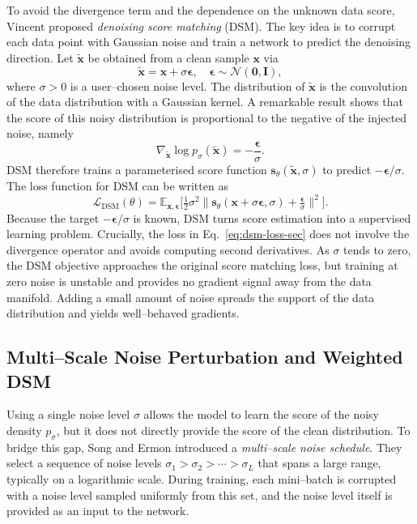To avoid the divergence term and the dependence on the unknown data
score, Vincent proposed \emph{denoising score matching} (DSM).  The key
idea is to corrupt each data point with Gaussian noise and train a
network to predict the denoising direction.  Let $\tilde{\mathbf{x}}$ be
obtained from a clean sample $\mathbf{x}$ via
\begin{equation}
    \tilde{\mathbf{x}} = \mathbf{x} + \sigma \boldsymbol{\epsilon},
    \quad \boldsymbol{\epsilon} \sim \mathcal{N}(\mathbf{0},\mathbf{I}),
    \label{eq:dsm-perturb}
\end{equation}
where $\sigma>0$ is a user–chosen noise level.  The distribution
of $\tilde{\mathbf{x}}$ is the convolution of the data distribution with
a Gaussian kernel.  A remarkable result shows that the score of this noisy
distribution is proportional to the negative of the injected noise,
namely
\begin{equation}
    \nabla_{\tilde{\mathbf{x}}} \log p_\sigma(\tilde{\mathbf{x}}) =
    -\frac{\boldsymbol{\epsilon}}{\sigma}.
\end{equation}
DSM therefore trains a parameterised score function
$\mathbf{s}_\theta(\tilde{\mathbf{x}},\sigma)$ to predict $-\boldsymbol{\epsilon}/\sigma$.
The loss function for DSM can be written as
\begin{equation}
    \mathcal{L}_{\text{DSM}}(\theta) =
    \mathbb{E}_{\mathbf{x},\boldsymbol{\epsilon}}
    \Big[ \tfrac{1}{2} \sigma^2 \big\| \mathbf{s}_\theta(\mathbf{x} +
    \sigma \boldsymbol{\epsilon}, \sigma) + \tfrac{\boldsymbol{\epsilon}}{\sigma}
    \big\|^2 \Big].
    \label{eq:dsm-loss-sec}
\end{equation}
Because the target $-\boldsymbol{\epsilon}/\sigma$ is known, DSM turns
score estimation into a supervised learning problem.  Crucially, the
loss in Eq.~\eqref{eq:dsm-loss-sec} does not involve the divergence
operator and avoids computing second derivatives.  As $\sigma$ tends to
zero, the DSM objective approaches the original score matching loss, but
training at zero noise is unstable and provides no gradient signal away
from the data manifold.  Adding a small amount of noise spreads the
support of the data distribution and yields well–behaved gradients.

\subsection{Multi--Scale Noise Perturbation and Weighted DSM}

Using a single noise level $\sigma$ allows the model to learn the score
of the noisy density $p_\sigma$, but it does not directly provide the
score of the clean distribution.  To bridge this gap, Song and Ermon
introduced a \emph{multi–scale noise schedule}.  They select a sequence
of noise levels $\sigma_1 > \sigma_2 > \cdots > \sigma_L$ that spans a
large range, typically on a logarithmic scale.  During training, each
mini–batch is corrupted with a noise level sampled uniformly from this
set, and the noise level itself is provided as an input to the network.

